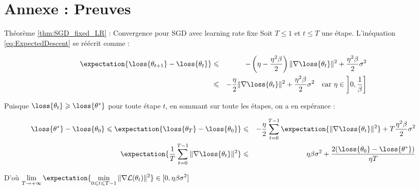 \documentclass{beamer}
\begin{document}
\section{Annexe : Preuves}

\begin{frame}{}{Théorème \ref{thm:SGD_fixed_LR} : Convergence pour SGD avec learning rate fixe}
	Soit $T\leqslant 1$ et $t\leqslant T$ une étape. L'inéquation \ref{eq:ExpectedDescent} se réécrit comme :
	
	\begin{eqnarray*}
		\expectation{\loss{\theta_{t+1}}-\loss{\theta_t}} &\leqslant& - \left(\eta - \frac{\eta^2\beta}{2}\right)\|\nabla \loss{\theta_t}\|^2 + \frac{\eta^2\beta}{2}\sigma^2\\
		&\leqslant& -\frac{\eta}{2}\|\nabla \loss{\theta_t}\|^2 + \frac{\eta^2\beta}{2}\sigma^2 \quad \text{car } \eta \in \left]0, \frac{1}{\beta}\right]
	\end{eqnarray*}
	
	Puisque $\loss{\theta_t} \geqslant \loss{\theta^*}$ pour toute étape $t$, en sommant sur toute les étapes, on a en espérance :
	
	\begin{eqnarray*}
		\loss{\theta^*}-\loss{\theta_0} \leqslant \expectation{\loss{\theta_T}-\loss{\theta_0}} &\leqslant& -\frac{\eta}{2}\sum_{t=0}^{T-1}\expectation{\|\nabla \loss{\theta_t}\|^2} + T\frac{\eta^2\beta}{2}\sigma^2\\
		\expectation{\frac{1}{T}\sum_{t=0}^{T-1}\|\nabla\loss{\theta_t}\|^2} &\leqslant& \eta\beta\sigma^2 + \frac{2(\loss{\theta_0}-\loss{\theta^*})}{\eta T}
	\end{eqnarray*}
	
	D'où $\displaystyle \lim_{T\rightarrow+\infty}\expectation{\min_{0\leqslant t\leqslant T-1}\|\nabla \mathcal{L}(\theta_t)\|^2} \in [0, \eta\beta\sigma^2]$
\end{frame}
\end{document}
